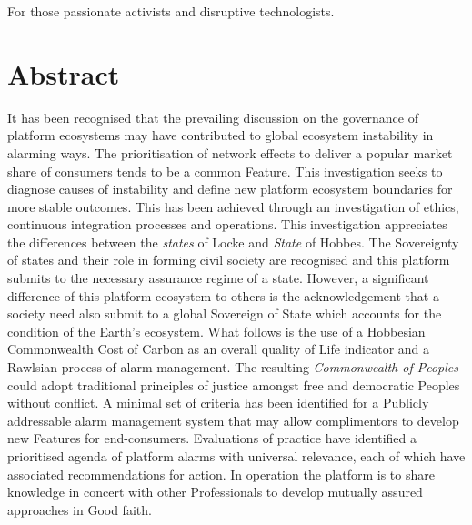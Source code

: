 \documentclass[11pt, oneside]{book}   	%
\begin{document}
\newpage
\thispagestyle{empty}
\mbox{}
\newpage

\vspace*{50mm}
\begin{center}
For those passionate activists and disruptive technologists.
\end{center}

\newpage
\thispagestyle{empty}
\mbox{}
\newpage

\chapter*{Abstract}
It has been recognised that the prevailing discussion on the governance of platform ecosystems may have contributed to global ecosystem instability in alarming ways.
The prioritisation of network effects to deliver a popular market share of consumers tends to be a common Feature.
This investigation seeks to diagnose causes of instability and define new platform ecosystem boundaries for more stable outcomes.
This has been achieved through an investigation of ethics, continuous integration processes and operations.
This investigation appreciates the differences between the \emph{states} of Locke and \emph{State} of Hobbes.
The Sovereignty of states and their role in forming civil society are recognised and this platform submits to the necessary assurance regime of a state.
However, a significant difference of this platform ecosystem to others is the acknowledgement that a society need also submit to a global Sovereign of State which accounts for the condition of the Earth's ecosystem.
What follows is the use of a Hobbesian Commonwealth Cost of Carbon as an overall quality of Life indicator and a Rawlsian process of alarm management.
The resulting \emph{Commonwealth of Peoples} could adopt traditional principles of justice amongst free and democratic Peoples without conflict.
A minimal set of criteria has been identified for a Publicly addressable alarm management system that may allow complimentors to develop new Features for end-consumers.
Evaluations of practice have identified a prioritised agenda of platform alarms with universal relevance, each of which have associated recommendations for action.
In operation the platform is to share knowledge in concert with other Professionals to develop mutually assured approaches in Good faith.

\newpage
\thispagestyle{empty}
\mbox{}
\newpage
\end{document}
